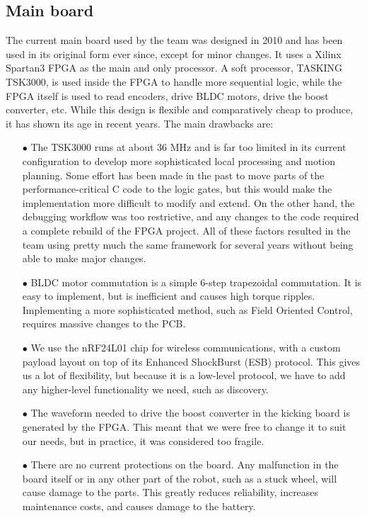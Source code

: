 \documentclass[runningheads]{llncs}
\begin{document}
\subsection{Main board}
The current main board used by the team was designed in 2010 and has been used in its original form ever since, except for minor changes. It uses a Xilinx Spartan3 FPGA as the main and only processor. A soft processor, TASKING TSK3000, is used inside the FPGA to handle more sequential logic, while the FPGA itself is used to read encoders, drive BLDC motors, drive the boost converter, etc.
While this design is flexible and comparatively cheap to produce, it has shown its age in recent years. The main drawbacks are:
\begin{enumerate}
    \item[$\bullet$] The TSK3000 runs at about 36 MHz and is far too limited in its current configuration to develop more sophisticated local processing and motion planning. Some effort has been made in the past to move parts of the performance-critical C code to the logic gates, but this would make the implementation more difficult to modify and extend. On the other hand, the debugging workflow was too restrictive, and any changes to the code required a complete rebuild of the FPGA project. All of these factors resulted in the team using pretty much the same framework for several years without being able to make major changes.
    \item[$\bullet$] BLDC motor commutation is a simple 6-step trapezoidal commutation. It is easy to implement, but is inefficient and causes high torque ripples. Implementing a more sophisticated method, such as Field Oriented Control, requires massive changes to the PCB.
    \item[$\bullet$] We use the nRF24L01 chip for wireless communications, with a custom payload layout on top of its Enhanced ShockBurst (ESB) protocol. This gives us a lot of flexibility, but because it is a low-level protocol, we have to add any higher-level functionality we need, such as discovery.
    \item[$\bullet$] The waveform needed to drive the boost converter in the kicking board is generated by the FPGA. This meant that we were free to change it to suit our needs, but in practice, it was considered too fragile.
    \item[$\bullet$] There are no current protections on the board. Any malfunction in the board itself or in any other part of the robot, such as a stuck wheel, will cause damage to the parts. This greatly reduces reliability, increases maintenance costs, and causes damage to the battery.
\end{enumerate}
\end{document}
